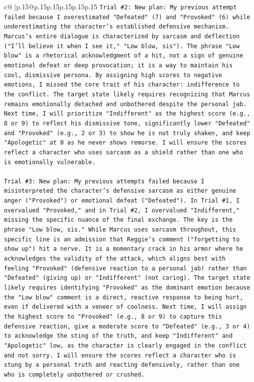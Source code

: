 \documentclass{article}
\begin{document}
{\begin{supertabular}{c@{$\;$}|p{.15\linewidth}@{}p{.15\linewidth}p{.15\linewidth}p{.15\linewidth}p{.15\linewidth}p{.15\linewidth}}
{{{\texttt{Trial \#2: New plan: My previous attempt failed because I overestimated "Defeated" (7) and "Provoked" (6) while underestimating the character's established defensive mechanism. Marcus's entire dialogue is characterized by sarcasm and deflection ("I'll believe it when I see it," "Low blow, sis"). The phrase "Low blow" is a rhetorical acknowledgment of a hit, not a sign of genuine emotional defeat or deep provocation; it is a way to maintain his cool, dismissive persona. By assigning high scores to negative emotions, I missed the core trait of his character: indifference to the conflict. The target state likely requires recognizing that Marcus remains emotionally detached and unbothered despite the personal jab. Next time, I will prioritize "Indifferent" as the highest score (e.g., 8 or 9) to reflect his dismissive tone, significantly lower "Defeated" and "Provoked" (e.g., 2 or 3) to show he is not truly shaken, and keep "Apologetic" at 0 as he never shows remorse. I will ensure the scores reflect a character who uses sarcasm as a shield rather than one who is emotionally vulnerable.} \\
\\ 
\texttt{Trial \#3: New plan: My previous attempts failed because I misinterpreted the character's defensive sarcasm as either genuine anger ("Provoked") or emotional defeat ("Defeated"). In Trial \#1, I overvalued "Provoked," and in Trial \#2, I overvalued "Indifferent," missing the specific nuance of the final exchange. The key is the phrase "Low blow, sis." While Marcus uses sarcasm throughout, this specific line is an admission that Reggie's comment ("forgetting to show up") hit a nerve. It is a momentary crack in his armor where he acknowledges the validity of the attack, which aligns best with feeling "Provoked" (defensive reaction to a personal jab) rather than "Defeated" (giving up) or "Indifferent" (not caring). The target state likely requires identifying "Provoked" as the dominant emotion because the "Low blow" comment is a direct, reactive response to being hurt, even if delivered with a veneer of coolness. Next time, I will assign the highest score to "Provoked" (e.g., 8 or 9) to capture this defensive reaction, give a moderate score to "Defeated" (e.g., 3 or 4) to acknowledge the sting of the truth, and keep "Indifferent" and "Apologetic" low, as the character is clearly engaged in the conflict and not sorry. I will ensure the scores reflect a character who is stung by a personal truth and reacting defensively, rather than one who is completely unbothered or crushed.} \\
}}}
\end{supertabular}}
\end{document}
